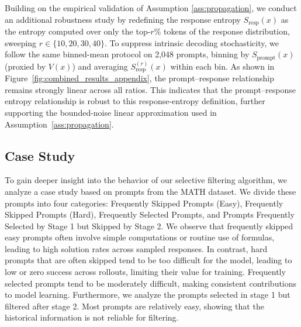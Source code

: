 Building on the empirical validation of Assumption \ref{ass:propagation}, we conduct an additional robustness study by redefining the response entropy $S_{\mathrm{resp}}(x)$ as the entropy computed over only the top-$r\%$ tokens of the response distribution, sweeping $r \in \{10,20,30,40\}$. To suppress intrinsic decoding stochasticity, we follow the same binned-mean protocol on 2{,}048 prompts, binning by $S_{\mathrm{prompt}}(x)$ (proxied by $V(x)$) and averaging $S_{\mathrm{resp}}^{(r)}(x)$ within each bin. As shown in Figure~\ref{fig:combined_results_appendix}, the prompt--response relationship remains strongly linear across all ratios.
This indicates that the prompt--response entropy relationship is robust to this response-entropy definition, further supporting the bounded-noise linear approximation used in Assumption~\ref{ass:propagation}.
 





\subsection{Case Study}

To gain deeper insight into the behavior of our selective filtering algorithm, we analyze a case study based on prompts from the MATH dataset. 
We divide these prompts into four categories: Frequently Skipped Prompts (Easy), Frequently Skipped Prompts (Hard), Frequently Selected Prompts, and Prompts Frequently Selected by Stage 1 but Skipped by Stage 2.
We observe that frequently skipped easy prompts often involve simple computations or routine use of formulas, leading to high solution rates across sampled responses. In contrast, hard prompts that are often skipped tend to be too difficult for the model, leading to low or zero success across rollouts, limiting their value for training.
Frequently selected prompts tend to be moderately difficult, making consistent contributions to model learning. 
Furthermore, we analyze the prompts selected in stage 1 but filtered after stage 2. 
Most prompts are relatively easy, showing that the historical information is not reliable for filtering.



